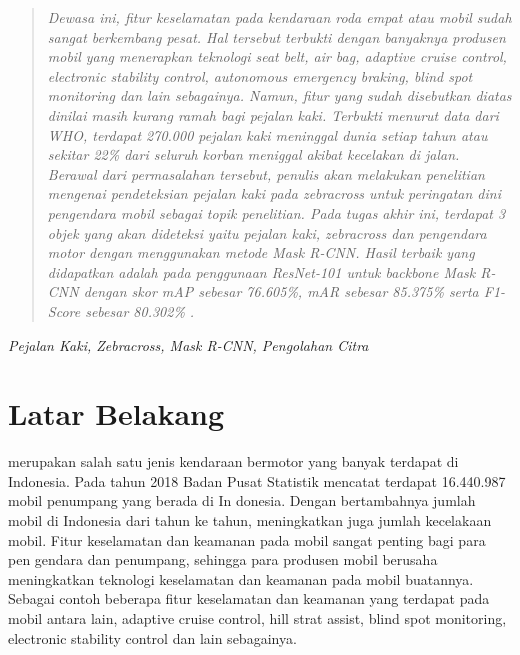 \documentclass[conference]{IEEEtran}
\begin{document}
	
	\begin{abstract}
		\textit{Dewasa ini, fitur keselamatan pada kendaraan roda empat atau mobil sudah sangat berkembang pesat. Hal tersebut terbukti dengan banyaknya produsen mobil yang menerapkan teknologi seat belt, air bag, adaptive cruise control, electronic stability control, autonomous emergency braking, blind spot monitoring dan lain sebagainya. Namun, fitur yang sudah disebutkan diatas dinilai masih kurang ramah bagi pejalan kaki. Terbukti menurut data dari WHO, terdapat 270.000 pejalan kaki meninggal dunia setiap tahun atau sekitar 22\% dari seluruh korban meniggal akibat kecelakan di jalan. Berawal dari permasalahan tersebut, penulis akan melakukan penelitian mengenai pendeteksian pejalan kaki pada zebracross untuk peringatan dini pengendara mobil sebagai topik penelitian. Pada tugas akhir ini, terdapat 3 objek yang akan dideteksi yaitu pejalan kaki, zebracross dan pengendara motor dengan menggunakan metode Mask R-CNN. Hasil terbaik yang didapatkan adalah pada penggunaan \textit{ResNet-101} untuk \textit{backbone Mask R-CNN} dengan skor \textit{mAP} sebesar 76.605\%, mAR sebesar 85.375\% serta \textit{F1-Score} sebesar 80.302\% .}
	\end{abstract}
	\begin{IEEEkeywords}
		\textit{Pejalan Kaki, Zebracross, Mask R-CNN, Pengolahan Citra}
	\end{IEEEkeywords}
	
	\section{Latar Belakang}
	 merupakan salah satu jenis kendaraan bermotor yang banyak terdapat di Indonesia. Pada tahun 2018 Badan Pusat Statistik mencatat terdapat 16.440.987 mobil penumpang yang berada di In donesia. Dengan bertambahnya jumlah mobil di Indonesia dari tahun ke tahun, meningkatkan juga jumlah kecelakaan mobil. Fitur keselamatan dan keamanan pada mobil sangat penting bagi para pen gendara dan penumpang, sehingga para produsen mobil berusaha meningkatkan teknologi keselamatan dan keamanan pada mobil buatannya. Sebagai contoh beberapa fitur keselamatan dan keamanan yang terdapat pada mobil antara lain, adaptive cruise control, hill strat assist, blind spot monitoring, electronic stability control dan lain sebagainya.\cite{cit:1}
	
	
	\vspace{1ex}
	
\end{document}
